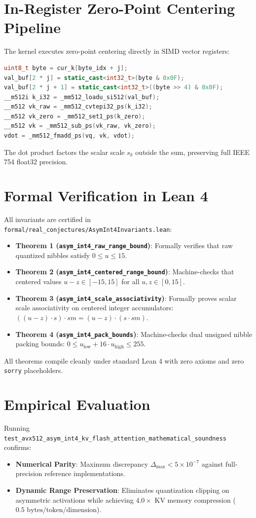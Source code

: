 \documentclass[11pt,a4paper]{article}
\begin{document}
\section{In-Register Zero-Point Centering Pipeline}
The kernel executes zero-point centering directly in SIMD vector registers:
\begin{lstlisting}[language=C++]
uint8_t byte = cur_k[byte_idx + j];
val_buf[2 * j] = static_cast<int32_t>(byte & 0x0F);
val_buf[2 * j + 1] = static_cast<int32_t>((byte >> 4) & 0x0F);
__m512i k_i32 = _mm512_loadu_si512(val_buf);
__m512 vk_raw = _mm512_cvtepi32_ps(k_i32);
__m512 vk_zero = _mm512_set1_ps(k_zero);
__m512 vk = _mm512_sub_ps(vk_raw, vk_zero);
vdot = _mm512_fmadd_ps(vq, vk, vdot);
\end{lstlisting}
The dot product factors the scalar scale $s_k$ outside the sum, preserving full IEEE 754 float32 precision.

\section{Formal Verification in Lean 4}
All invariants are certified in \texttt{formal/real\_conjectures/AsymInt4Invariants.lean}:
\begin{itemize}
    \item \textbf{Theorem 1 (\texttt{asym\_int4\_raw\_range\_bound})}: Formally verifies that raw quantized nibbles satisfy $0 \le u \le 15$.
    \item \textbf{Theorem 2 (\texttt{asym\_int4\_centered\_range\_bound})}: Machine-checks that centered values $u - z \in [-15, 15]$ for all $u, z \in [0, 15]$.
    \item \textbf{Theorem 3 (\texttt{asym\_int4\_scale\_associativity})}: Formally proves scalar scale associativity on centered integer accumulators: $((u - z) \cdot s) \cdot sm = (u - z) \cdot (s \cdot sm)$.
    \item \textbf{Theorem 4 (\texttt{asym\_int4\_pack\_bounds})}: Machine-checks dual unsigned nibble packing bounds: $0 \le u_{\text{low}} + 16 \cdot u_{\text{high}} \le 255$.
\end{itemize}
All theorems compile cleanly under standard Lean 4 with zero axioms and zero \texttt{sorry} placeholders.

\section{Empirical Evaluation}
Running \texttt{test\_avx512\_asym\_int4\_kv\_flash\_attention\_mathematical\_soundness} confirms:
\begin{itemize}
    \item \textbf{Numerical Parity}: Maximum discrepancy $\Delta_{\max} < 5 \times 10^{-7}$ against full-precision reference implementations.
    \item \textbf{Dynamic Range Preservation}: Eliminates quantization clipping on asymmetric activations while achieving $4.0\times$ KV memory compression ($0.5\text{ bytes/token/dimension}$).
\end{itemize}
\end{document}

